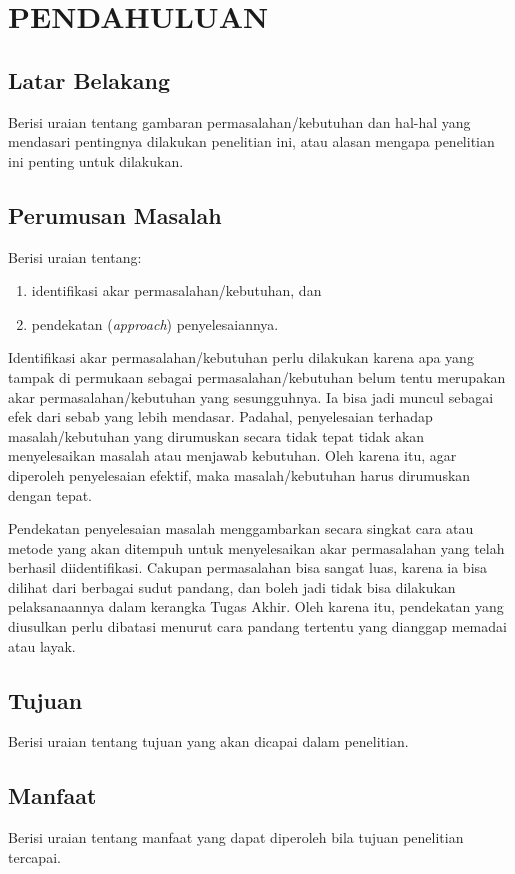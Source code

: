 \chapter{PENDAHULUAN}\label{pendahuluan}
\section{Latar Belakang}\label{latar belakang}

Berisi uraian tentang gambaran permasalahan/kebutuhan dan hal-hal yang mendasari pentingnya dilakukan penelitian ini, atau alasan mengapa penelitian ini penting untuk dilakukan.

\section{Perumusan Masalah}
Berisi uraian tentang:
\begin{enumerate}
    \item identifikasi akar permasalahan/kebutuhan, dan 
   \item pendekatan (\textit{approach}) penyelesaiannya.
\end{enumerate}


Identifikasi akar permasalahan/kebutuhan perlu dilakukan karena apa yang tampak di permukaan sebagai permasalahan/kebutuhan belum tentu merupakan akar permasalahan/kebutuhan yang sesungguhnya.  Ia bisa jadi muncul sebagai efek dari sebab yang lebih mendasar. Padahal, penyelesaian terhadap masalah/kebutuhan yang dirumuskan secara tidak tepat tidak akan menyelesaikan masalah atau menjawab kebutuhan. Oleh karena itu, agar diperoleh penyelesaian efektif, maka masalah/kebutuhan harus dirumuskan dengan tepat.

Pendekatan penyelesaian masalah menggambarkan secara singkat cara atau metode yang akan ditempuh untuk menyelesaikan akar permasalahan yang telah berhasil diidentifikasi. Cakupan permasalahan bisa sangat luas, karena ia bisa dilihat dari berbagai sudut pandang, dan boleh jadi tidak bisa dilakukan pelaksanaannya dalam kerangka Tugas Akhir. Oleh karena itu, pendekatan yang diusulkan perlu dibatasi  menurut cara pandang tertentu yang dianggap memadai atau layak.

\section{Tujuan}
Berisi uraian tentang tujuan yang akan dicapai dalam penelitian.

\section{Manfaat}
Berisi uraian tentang manfaat yang dapat diperoleh bila  tujuan penelitian tercapai.


